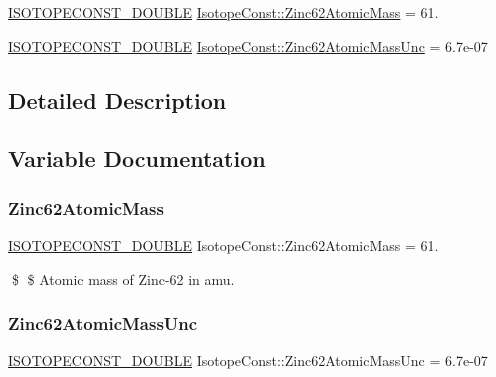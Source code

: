 \begin{DoxyCompactItemize}
\item 
\mbox{\hyperlink{group___isotope_const-_macros_ga8f45a7272ce02c0b4c65c44636ed719a}{I\+S\+O\+T\+O\+P\+E\+C\+O\+N\+S\+T\+\_\+\+D\+O\+U\+B\+LE}} \mbox{\hyperlink{group___isotope_const-_zinc-_zn62_ga4c8f9f455ca133b60954be69641af43f}{Isotope\+Const\+::\+Zinc62\+Atomic\+Mass}} = 61.
\item 
\mbox{\hyperlink{group___isotope_const-_macros_ga8f45a7272ce02c0b4c65c44636ed719a}{I\+S\+O\+T\+O\+P\+E\+C\+O\+N\+S\+T\+\_\+\+D\+O\+U\+B\+LE}} \mbox{\hyperlink{group___isotope_const-_zinc-_zn62_gae610ba90d5701c8080209ab6eef65983}{Isotope\+Const\+::\+Zinc62\+Atomic\+Mass\+Unc}} = 6.\+7e-\/07
\end{DoxyCompactItemize}


\subsection{Detailed Description}


\subsection{Variable Documentation}
\mbox{\label{group___isotope_const-_zinc-_zn62_ga4c8f9f455ca133b60954be69641af43f}} 
\subsubsection{\texorpdfstring{Zinc62\+Atomic\+Mass}{Zinc62AtomicMass}}
{\footnotesize\ttfamily \mbox{\hyperlink{group___isotope_const-_macros_ga8f45a7272ce02c0b4c65c44636ed719a}{I\+S\+O\+T\+O\+P\+E\+C\+O\+N\+S\+T\+\_\+\+D\+O\+U\+B\+LE}} Isotope\+Const\+::\+Zinc62\+Atomic\+Mass = 61.}

\$ \$ Atomic mass of Zinc-\/62 in amu. \mbox{\label{group___isotope_const-_zinc-_zn62_gae610ba90d5701c8080209ab6eef65983}} 
\subsubsection{\texorpdfstring{Zinc62\+Atomic\+Mass\+Unc}{Zinc62AtomicMassUnc}}
{\footnotesize\ttfamily \mbox{\hyperlink{group___isotope_const-_macros_ga8f45a7272ce02c0b4c65c44636ed719a}{I\+S\+O\+T\+O\+P\+E\+C\+O\+N\+S\+T\+\_\+\+D\+O\+U\+B\+LE}} Isotope\+Const\+::\+Zinc62\+Atomic\+Mass\+Unc = 6.\+7e-\/07}

